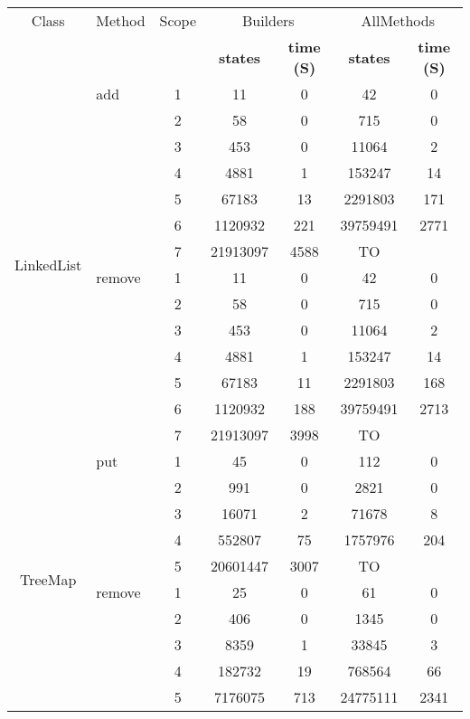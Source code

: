 
\begin{table}
\scriptsize
\begin{tabular}{ c| l| c c c c c}
\hline
Class & Method & Scope &
\multicolumn{2}{c}{\textsf{Builders}} &
\multicolumn{2}{c}{\textsf{AllMethods}} \\
&&&
\tiny{\textbf{states}} & \tiny{\textbf{time (S)}} &
\tiny{\textbf{states}} & \tiny{\textbf{time (S)} }\\
\hline
\multirow{14}{*}{LinkedList} 
& add
  & 1 & 11  & 0 & 42  & 0 \\
& & 2 & 58  & 0 & 715 & 0 \\
& & 3 & 453 & 0 & 11064 & 2 \\
& & 4 & 4881  & 1 & 153247  & 14  \\
& & 5 & 67183 & 13  & 2291803 & 171 \\
& & 6 & 1120932 & 221 & 39759491  & 2771  \\
& & 7 & 21913097  & 4588  &TO  & \\

\cline{2-7}
 &remove 
  & 1 & 11  & 0 & 42  & 0 \\
& & 2 & 58  & 0 & 715 & 0 \\
& & 3 & 453 & 0 & 11064 & 2\\
& & 4 & 4881  & 1 & 153247  & 14\\
& & 5 & 67183 & 11  & 2291803 & 168\\
& & 6 & 1120932 & 188 & 39759491  & 2713\\
& & 7 & 21913097  & 3998  & TO \\ 

\hline
\multirow{10}{*}{TreeMap} 
& put
  & 1 & 45  & 0 & 112 & 0 \\
& & 2 & 991 & 0 & 2821  & 0 \\
& & 3 & 16071 & 2 & 71678 & 8 \\
& & 4 & 552807  & 75  & 1757976 & 204 \\
& & 5 & 20601447  & 3007  & TO& \\
\cline{2-7}

& remove
  & 1 & 25  & 0 & 61  & 0 \\
& & 2 & 406 & 0 & 1345  & 0 \\
& & 3 & 8359  & 1 & 33845 & 3 \\
& & 4 & 182732  & 19  & 768564  & 66  \\
& & 5 & 7176075 & 713 & 24775111  & 2341  \\






\end{tabular}
\end{table}
